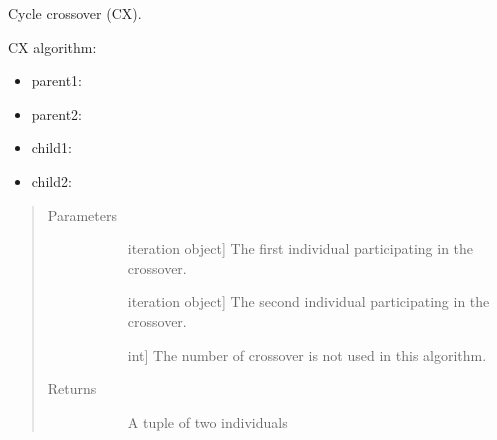 \documentclass[letterpaper,10pt,english]{sphinxmanual}
\begin{document}
\begin{fulllineitems}
\label{\detokenize{pygace:pygace.ga.cycle_crossover}}
Cycle crossover (CX).

CX algorithm:
\begin{itemize}
\item {} 
parent1: 

\item {} 
parent2: 

\item {} 
child1: 

\item {} 
child2: 

\end{itemize}
\begin{quote}\begin{description}
\item[{Parameters}] \leavevmode\begin{description}
\item[{}] \leavevmode{[}iteration object{]}
The first individual participating in the crossover.

\item[{}] \leavevmode{[}iteration object{]}
The second individual participating in the crossover.

\item[{}] \leavevmode{[}int{]}
The number of crossover is not used in this algorithm.

\end{description}

\item[{Returns}] \leavevmode\begin{description}
\item[{}] \leavevmode
A tuple of two individuals

\end{description}

\end{description}\end{quote}

\end{fulllineitems}
\end{document}
